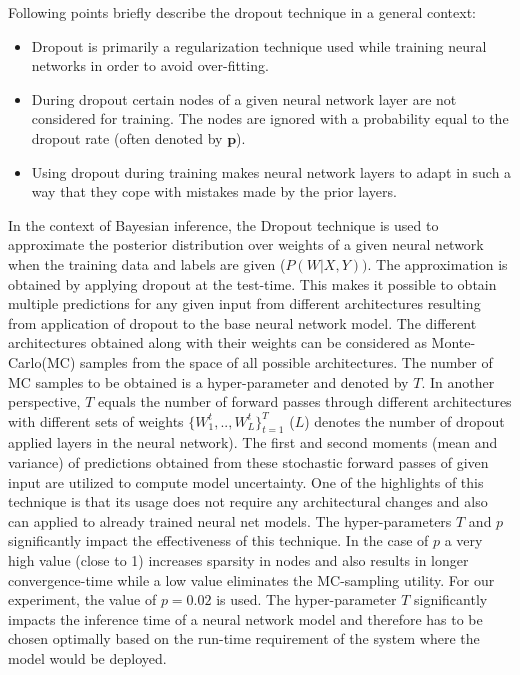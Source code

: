 	Following points briefly describe the dropout technique in a general context:
	\begin{itemize}
		\item Dropout \cite{srivastava2014dropout} is primarily a regularization technique used while training neural networks in order to avoid over-fitting.
		\item During dropout certain nodes of a given neural network layer are not considered for training. The nodes are ignored with a probability equal to the dropout rate (often denoted by $\textbf{p}$).
		\item Using dropout during training makes neural network layers to adapt in such a way that they cope with mistakes made by the prior layers. 
		
	\end{itemize}
	
	In the context of Bayesian inference, the Dropout technique is used to approximate the posterior distribution over weights of a given neural network when the training data and labels are given ($P(W|X,Y))$. The approximation is obtained by applying dropout at the test-time. This makes it possible to obtain multiple predictions for any given input from different architectures resulting from application of dropout to the base neural network model. The different architectures obtained along with their weights can be considered as Monte-Carlo(MC) samples from the space of all possible architectures. The number of MC samples to be obtained is a hyper-parameter and denoted by $T$. In another perspective, $T$ equals the number of forward passes through different architectures with different sets of weights $\{W_{1}^t,..,W_{L}^t\}_{t=1}^T$ ($L$) denotes the number of dropout applied layers in the neural network). The first and second moments (mean and variance) of predictions obtained from these stochastic forward passes of given input are utilized to compute model uncertainty. One of the highlights of this technique is that its usage does not require any architectural changes and also can applied to already trained neural net models. The hyper-parameters $T$ and $p$ significantly impact the effectiveness of this technique. In the case of $p$ a very high value (close to 1) increases sparsity in nodes and also results in longer convergence-time while a low value eliminates the MC-sampling utility. For our experiment, the value of $p=0.02$ is used. The hyper-parameter $T$ significantly impacts the inference time of a neural network model and therefore has to be chosen optimally based on the run-time requirement of the system where the model would be deployed.
	
